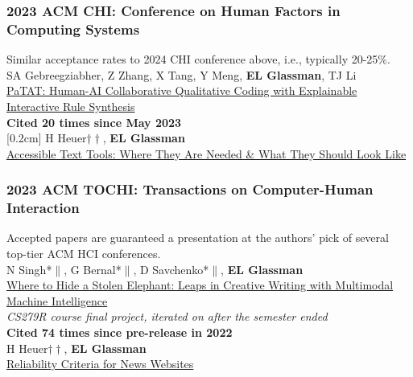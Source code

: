 \documentclass[10pt, a4paper]{article}
\newcommand{\years}[1]{\marginnote{\normalsize #1}}
\begin{document}
\subsubsection*{2023 ACM \textbf{CHI}: Conference on Human Factors in Computing Systems}
Similar acceptance rates to 2024 CHI conference above, i.e., typically 20-25\%.\\[0.2cm]
\years{\textbf{C30}}SA Gebreegziabher, Z Zhang, X Tang, Y Meng, \textbf{EL Glassman}, TJ Li\\ \href{http://glassmanlab.seas.harvard.edu/papers/patat_CHI23.pdf}{PaTAT: Human-AI Collaborative Qualitative Coding with Explainable Interactive Rule Synthesis}\\
\textbf{Cited 20 times since May 2023}\\
[0.2cm]
\years{\textbf{C29} LBW}H Heuer$\dagger\dagger$, \textbf{EL Glassman}\\
\href{https://glassmanlab.seas.harvard.edu/papers/heuer_CHI23LBW_accessibleTextTools.pdf}{Accessible Text Tools: Where They Are Needed \& What They Should Look Like}\\

\subsubsection*{2023 ACM \textbf{TOCHI}: Transactions on Computer-Human Interaction}
Accepted papers are guaranteed a presentation at the authors' pick of several top-tier ACM HCI conferences.\\

\years{\textbf{J4}}N Singh*$\|$, G Bernal*$\|$, D Savchenko*$\|$, \textbf{EL Glassman}\\
\href{http://glassmanlab.seas.harvard.edu/papers/elephant_tochi2022.pdf}{Where to Hide a Stolen Elephant: Leaps in Creative Writing with Multimodal Machine Intelligence}\\
\textit{CS279R course final project, iterated on after the semester ended}\\
\textbf{Cited 74 times since pre-release in 2022}\\[0.2cm]
\years{\textbf{J3}}H Heuer$\dagger\dagger$, \textbf{EL Glassman}\\
\href{http://glassmanlab.seas.harvard.edu/papers/reliability_criteria.pdf}{Reliability Criteria for News Websites}
\end{document}
